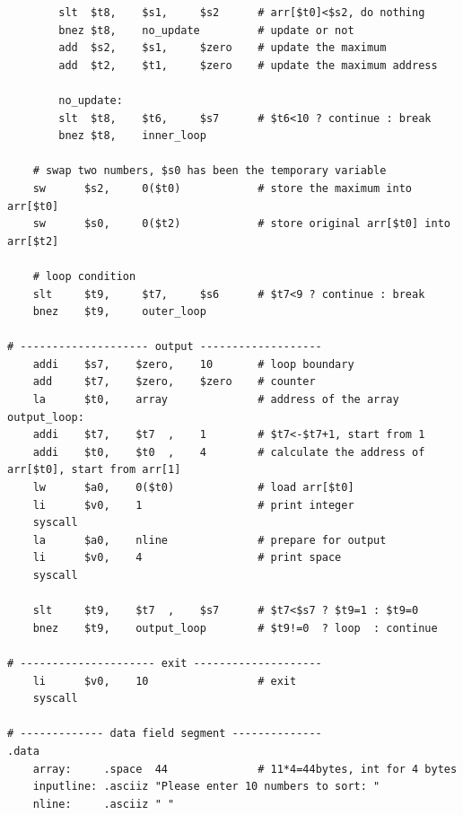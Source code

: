 \documentclass[12pt,UTF8]{ctexart}
\begin{document}
\begin{spacing}{1.1}
\begin{lstlisting}
        slt  $t8,    $s1,     $s2      # arr[$t0]<$s2, do nothing
        bnez $t8,    no_update         # update or not
        add  $s2,    $s1,     $zero    # update the maximum
        add  $t2,    $t1,     $zero    # update the maximum address

        no_update:
        slt  $t8,    $t6,     $s7      # $t6<10 ? continue : break
        bnez $t8,    inner_loop
    
    # swap two numbers, $s0 has been the temporary variable
    sw      $s2,     0($t0)            # store the maximum into arr[$t0]
    sw      $s0,     0($t2)            # store original arr[$t0] into arr[$t2]

    # loop condition
    slt     $t9,     $t7,     $s6      # $t7<9 ? continue : break
    bnez    $t9,     outer_loop

# -------------------- output -------------------
    addi    $s7,    $zero,    10       # loop boundary
    add     $t7,    $zero,    $zero    # counter
    la      $t0,    array              # address of the array
output_loop:
    addi    $t7,    $t7  ,    1        # $t7<-$t7+1, start from 1
    addi    $t0,    $t0  ,    4        # calculate the address of arr[$t0], start from arr[1]
    lw      $a0,    0($t0)             # load arr[$t0]
    li      $v0,    1                  # print integer
    syscall
    la      $a0,    nline              # prepare for output
    li      $v0,    4                  # print space
    syscall

    slt     $t9,    $t7  ,    $s7      # $t7<$s7 ? $t9=1 : $t9=0
    bnez    $t9,    output_loop        # $t9!=0  ? loop  : continue

# --------------------- exit --------------------
    li      $v0,    10                 # exit
    syscall

# ------------- data field segment --------------
.data
    array:     .space  44              # 11*4=44bytes, int for 4 bytes
    inputline: .asciiz "Please enter 10 numbers to sort: "
    nline:     .asciiz " "
\end{lstlisting}
\end{spacing}
\end{document}
